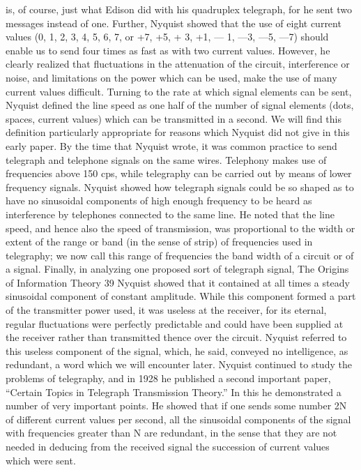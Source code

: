 is, of course, just what Edison did with his quadruplex telegraph,
for he sent two messages instead of one. Further, Nyquist showed
that the use of eight current values (0, 1, 2, 3, 4, 5, 6, 7, or +7, +5,
+ 3, +1, — 1, —3, —5, —7) should enable us to send four times
as fast as with two current values. However, he clearly realized that
fluctuations in the attenuation of the circuit, interference or noise,
and limitations on the power which can be used, make the use of
many current values difficult.
Turning to the rate at which signal elements can be sent, Nyquist
defined the line speed as one half of the number of signal elements
(dots, spaces, current values) which can be transmitted in a second.
We will find this definition particularly appropriate for reasons
which Nyquist did not give in this early paper.
By the time that Nyquist wrote, it was common practice to send
telegraph and telephone signals on the same wires. Telephony
makes use of frequencies above 150 cps, while telegraphy can be
carried out by means of lower frequency signals. Nyquist showed
how telegraph signals could be so shaped as to have no sinusoidal
components of high enough frequency to be heard as interference
by telephones connected to the same line. He noted that the line
speed, and hence also the speed of transmission, was proportional
to the width or extent of the range or band (in the sense of strip)
of frequencies used in telegraphy; we now call this range of frequencies
the band width of a circuit or of a signal.
Finally, in analyzing one proposed sort of telegraph signal,
The Origins of Information Theory
39
Nyquist showed that it contained at all times a steady sinusoidal
component of constant amplitude. While this component formed
a part of the transmitter power used, it was useless at the receiver,
for its eternal, regular fluctuations were perfectly predictable and
could have been supplied at the receiver rather than transmitted
thence over the circuit. Nyquist referred to this useless component
of the signal, which, he said, conveyed no intelligence, as redundant,
a word which we will encounter later.
Nyquist continued to study the problems of telegraphy, and in
1928 he published a second important paper, “Certain Topics in
Telegraph Transmission Theory.” In this he demonstrated a number
of very important points. He showed that if one sends some
number 2N of different current values per second, all the sinusoidal
components of the signal with frequencies greater than N are
redundant, in the sense that they are not needed in deducing from
the received signal the succession of current values which were sent.
